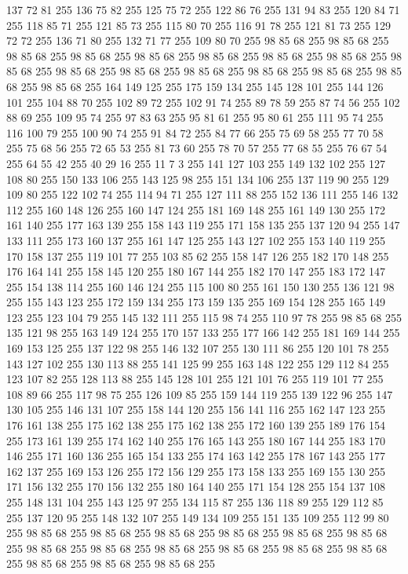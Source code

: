 137 72 81 255 136 75 82 255 125 75 72 255 122 86 76 255 131 94 83 255 120 84 71 255 118 85 71 255 121 85 73 255 115 80 70 255 116 91 78 255 121 81 73 255 129 72 72 255 136 71 80 255 132 71 77 255 109 80 70 255 98 85 68 255 98 85 68 255 98 85 68 255 98 85 68 255 98 85 68 255 98 85 68 255 98 85 68 255 98 85 68 255 98 85 68 255 98 85 68 255 98 85 68 255 98 85 68 255 98 85 68 255 98 85 68 255 98 85 68 255 98 85 68 255 164 149 125 255 175 159 134 255 145 128 101 255 144 126 101 255 104 88 70 255 102 89 72 255 102 91 74 255 89 78 59 255 87 74 56 255 102 88 69 255 109 95 74 255 97 83 63 255 95 81 61 255 95 80 61 255 111 95 74 255 116 100 79 255 100 90 74 255 91 84 72 255 84 77 66 255 75 69 58 255 77 70 58 255 75 68 56 255 72 65 53 255 81 73 60 255 78 70 57 255 77 68 55 255 76 67 54 255 64 55 42 255 40 29 16 255 11 7 3 255 141 127 103 255 149 132 102 255 127 108 80 255
150 133 106 255 143 125 98 255 151 134 106 255 137 119 90 255 129 109 80 255 122 102 74 255 114 94 71 255 127 111 88 255 152 136 111 255 146 132 112 255 160 148 126 255 160 147 124 255 181 169 148 255 161 149 130 255 172 161 140 255 177 163 139 255 158 143 119 255 171 158 135 255 137 120 94 255 147 133 111 255 173 160 137 255 161 147 125 255 143 127 102 255 153 140 119 255 170 158 137 255 119 101 77 255 103 85 62 255 158 147 126 255 182 170 148 255 176 164 141 255 158 145 120 255 180 167 144 255 182 170 147 255 183 172 147 255 154 138 114 255 160 146 124 255 115 100 80 255 161 150 130 255 136 121 98 255 155 143 123 255 172 159 134 255 173 159 135 255 169 154 128 255 165 149 123 255 123 104 79 255 145 132 111 255 115 98 74 255 110 97 78 255 98 85 68 255 135 121 98 255 163 149 124 255 170 157 133 255 177 166 142 255 181 169 144 255 169 153 125 255 137 122 98 255 146 132 107 255 130 111 86 255 120 101 78 255 143 127 102 255 130 113 88 255 141 125 99 255 163 148 122 255 129 112 84 255
123 107 82 255 128 113 88 255 145 128 101 255 121 101 76 255 119 101 77 255 108 89 66 255 117 98 75 255 126 109 85 255 159 144 119 255 139 122 96 255 147 130 105 255 146 131 107 255 158 144 120 255 156 141 116 255 162 147 123 255 176 161 138 255 175 162 138 255 175 162 138 255 172 160 139 255 189 176 154 255 173 161 139 255 174 162 140 255 176 165 143 255 180 167 144 255 183 170 146 255 171 160 136 255 165 154 133 255 174 163 142 255 178 167 143 255 177 162 137 255 169 153 126 255 172 156 129 255 173 158 133 255 169 155 130 255 171 156 132 255 170 156 132 255 180 164 140 255 171 154 128 255 154 137 108 255 148 131 104 255 143 125 97 255 134 115 87 255 136 118 89 255 129 112 85 255 137 120 95 255 148 132 107 255 149 134 109 255 151 135 109 255 112 99 80 255 98 85 68 255 98 85 68 255 98 85 68 255 98 85 68 255 98 85 68 255 98 85 68 255 98 85 68 255 98 85 68 255 98 85 68 255 98 85 68 255 98 85 68 255 98 85 68 255 98 85 68 255 98 85 68 255 98 85 68 255
